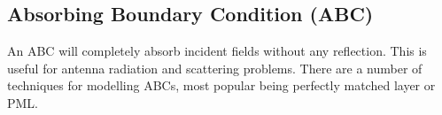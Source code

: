 \subsection{Absorbing Boundary Condition (ABC)}
An ABC will completely absorb incident fields without any reflection. This is useful for antenna radiation and scattering problems. There are a number of techniques for modelling ABCs, most popular being perfectly matched layer or PML.
\begin{figure}[H]
\centering
\mbox{\quad{}}

\end{figure}
